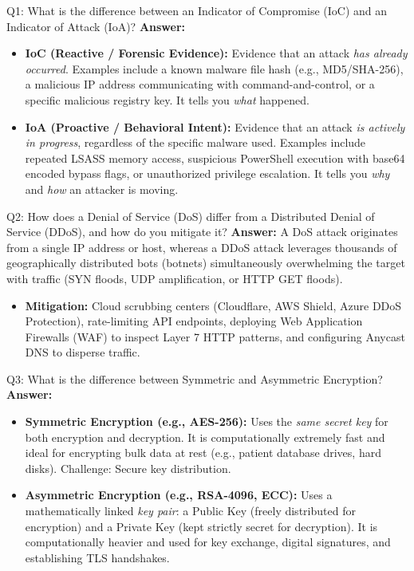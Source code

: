 \documentclass[10pt,a4paper]{article}
\begin{document}
\begin{qa}{Q1: What is the difference between an Indicator of Compromise (IoC) and an Indicator of Attack (IoA)?}
\textbf{Answer:}
\begin{itemize}[noitemsep]
    \item \textbf{IoC (Reactive / Forensic Evidence):} Evidence that an attack \textit{has already occurred}. Examples include a known malware file hash (e.g., MD5/SHA-256), a malicious IP address communicating with command-and-control, or a specific malicious registry key. It tells you \textit{what} happened.
    \item \textbf{IoA (Proactive / Behavioral Intent):} Evidence that an attack \textit{is actively in progress}, regardless of the specific malware used. Examples include repeated LSASS memory access, suspicious PowerShell execution with base64 encoded bypass flags, or unauthorized privilege escalation. It tells you \textit{why} and \textit{how} an attacker is moving.
\end{itemize}
\end{qa}

\begin{qa}{Q2: How does a Denial of Service (DoS) differ from a Distributed Denial of Service (DDoS), and how do you mitigate it?}
\textbf{Answer:}
A DoS attack originates from a single IP address or host, whereas a DDoS attack leverages thousands of geographically distributed bots (botnets) simultaneously overwhelming the target with traffic (SYN floods, UDP amplification, or HTTP GET floods).
\begin{itemize}[noitemsep]
    \item \textbf{Mitigation:} Cloud scrubbing centers (Cloudflare, AWS Shield, Azure DDoS Protection), rate-limiting API endpoints, deploying Web Application Firewalls (WAF) to inspect Layer 7 HTTP patterns, and configuring Anycast DNS to disperse traffic.
\end{itemize}
\end{qa}

\begin{qa}{Q3: What is the difference between Symmetric and Asymmetric Encryption?}
\textbf{Answer:}
\begin{itemize}[noitemsep]
    \item \textbf{Symmetric Encryption (e.g., AES-256):} Uses the \textit{same secret key} for both encryption and decryption. It is computationally extremely fast and ideal for encrypting bulk data at rest (e.g., patient database drives, hard disks). Challenge: Secure key distribution.
    \item \textbf{Asymmetric Encryption (e.g., RSA-4096, ECC):} Uses a mathematically linked \textit{key pair}: a Public Key (freely distributed for encryption) and a Private Key (kept strictly secret for decryption). It is computationally heavier and used for key exchange, digital signatures, and establishing TLS handshakes.
\end{itemize}
\end{qa}
\end{document}
